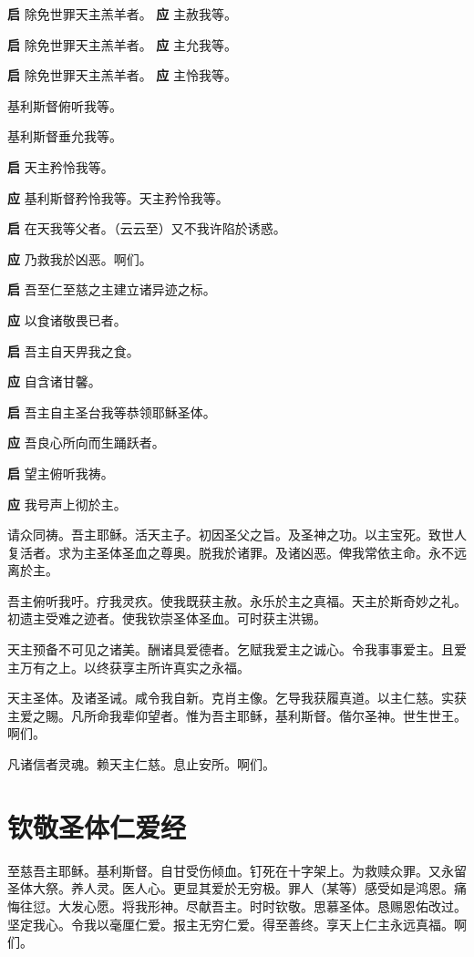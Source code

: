 \documentclass[UTF8,17pt]{ctexart}
\begin{document}
\textbf{启} \quad 除免世罪天主羔⽺者。 \hfill \textbf{应} \quad 主赦我等。

\textbf{启} \quad 除免世罪天主羔⽺者。 \hfill \textbf{应} \quad 主允我等。

\textbf{启} \quad 除免世罪天主羔⽺者。 \hfill \textbf{应} \quad 主怜我等。

 基利斯督俯听我等。

 基利斯督垂允我等。

\textbf{启} \quad 天主矜怜我等。

\textbf{应} \quad 基利斯督矜怜我等。天主矜怜我等。

\textbf{启} \quad 在天我等⽗者。（云云⾄）又不我许陷於诱惑。

\textbf{应} \quad 乃救我於凶恶。啊们。

\textbf{启} \quad 吾⾄仁⾄慈之主建⽴诸异迹之标。

\textbf{应} \quad 以⾷诸敬畏已者。

\textbf{启} \quad 吾主⾃天畀我之⾷。

\textbf{应} \quad ⾃含诸⽢馨。

\textbf{启} \quad 吾主⾃主圣台我等恭领耶稣圣体。

\textbf{应} \quad 吾良⼼所向⽽⽣踊跃者。

\textbf{启} \quad 望主俯听我祷。

\textbf{应} \quad 我号声上彻於主。

请众同祷。\quad 吾主耶稣。活天主⼦。初因圣⽗之旨。及圣神之功。以主宝死。致世⼈复活者。求为主圣体圣⾎之尊奥。脱我於诸罪。及诸凶恶。俾我常依主命。永不远离於主。

吾主俯听我吁。疗我灵疚。使我既获主赦。永乐於主之真福。天主於斯奇妙之礼。初遗主受难之迹者。使我钦崇圣体圣⾎。可时获主洪锡。

天主预备不可见之诸美。酬诸具爱德者。乞赋我爱主之诚⼼。令我事事爱主。且爱主万有之上。以终获享主所许真实之永福。

天主圣体。及诸圣诫。咸令我⾃新。克肖主像。乞导我获履真道。以主仁慈。实获主爱之賜。凡所命我辈仰望者。惟为吾主耶稣，基利斯督。偕尔圣神。世⽣世王。啊们。

凡诸信者灵魂。赖天主仁慈。息⽌安所。啊们。

\section{钦敬圣体仁爱经}

⾄慈吾主耶稣。基利斯督。⾃⽢受伤倾⾎。钉死在⼗字架上。为救赎众罪。又永留圣体⼤祭。养⼈灵。医⼈⼼。更显其爱於⽆穷极。罪⼈（某等）感受如是鸿恩。痛悔往愆。⼤发⼼愿。将我形神。尽献吾主。时时钦敬。思慕圣体。恳赐恩佑改过。坚定我⼼。令我以毫厘仁爱。报主⽆穷仁爱。得⾄善终。享天上仁主永远真福。啊们。
\end{document}

